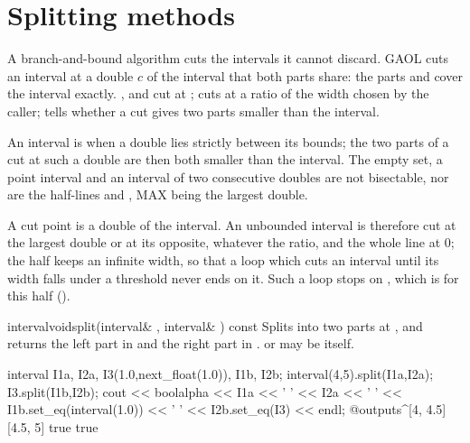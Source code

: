 \section{Splitting methods}\label{sec:splitting}
%

A branch-and-bound algorithm cuts the intervals it cannot discard. GAOL cuts
an interval  at a double $c$ of the interval that both parts
share: the parts  and  cover the interval exactly.
,  and  cut at
;  cuts at a ratio of the width chosen by
the caller;  tells whether a cut gives two parts
smaller than the interval.

\begin{Def}\label{def:functions-bisectable}
An interval is  when a double lies strictly between its
bounds; the two parts of a cut at such a double are then both smaller than
the interval. The empty set, a point interval and an interval of two
consecutive doubles are not bisectable, nor are the half-lines
 and , MAX being the
largest double.
\end{Def}

\begin{Rem}\label{rem:functions-unbounded-cut}
A cut point is a double of the interval. An unbounded interval is therefore
cut at the largest double or at its opposite, whatever the ratio, and the
whole line at $0$; the half  keeps an infinite
width, so that a loop which cuts an interval until its width falls under a
threshold never ends on it. Such a loop stops on ,
which is  for this half ().\newinvfive
\end{Rem}

\begin{defmethod}{interval}{void}{split}{(interval\& , interval\& ) const}
  Splits  into two parts at , and returns the
  left part in  and the right part in .  or
   may be  itself.
  \begin{example}
interval I1a, I2a,
         I3(1.0,next_float(1.0)),
         I1b, I2b;
interval(4,5).split(I1a,I2a);
I3.split(I1b,I2b);
cout << boolalpha << I1a << ' ' << I2a << ' '
     << I1b.set_eq(interval(1.0)) << ' ' << I2b.set_eq(I3) << endl;
@outputs^[4, 4.5] [4.5, 5] true true~
  \end{example}
\end{defmethod}

